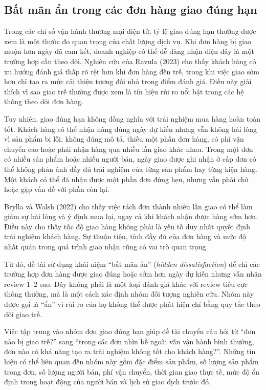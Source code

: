 \subsection{Bất mãn ẩn trong các đơn hàng giao đúng hạn}
\label{subsec:bat-man-an}

Trong các chỉ số vận hành thương mại điện tử, tỷ lệ giao đúng hạn thường được xem là một thước đo quan trọng của chất lượng dịch vụ. Khi đơn hàng bị giao muộn hơn ngày đã cam kết, doanh nghiệp có thể dễ dàng nhận diện đây là một trường hợp cần theo dõi. Nghiên cứu của Ravula (2023) cho thấy khách hàng có xu hướng đánh giá thấp rõ rệt hơn khi đơn hàng đến trễ, trong khi việc giao sớm hơn chỉ tạo ra mức cải thiện tương đối nhỏ trong điểm đánh giá. Điều này giải thích vì sao giao trễ thường được xem là tín hiệu rủi ro nổi bật trong các hệ thống theo dõi đơn hàng.

Tuy nhiên, giao đúng hạn không đồng nghĩa với trải nghiệm mua hàng hoàn toàn tốt. Khách hàng có thể nhận hàng đúng ngày dự kiến nhưng vẫn không hài lòng vì sản phẩm bị lỗi, không đúng mô tả, thiếu một phần đơn hàng, có phí vận chuyển cao hoặc phải nhận hàng qua nhiều lần giao khác nhau. Trong một đơn có nhiều sản phẩm hoặc nhiều người bán, ngày giao được ghi nhận ở cấp đơn có thể không phản ánh đầy đủ trải nghiệm của từng sản phẩm hay từng kiện hàng. Một khách có thể đã nhận được một phần đơn đúng hẹn, nhưng vẫn phải chờ hoặc gặp vấn đề với phần còn lại.

Brylla và Walsh (2022) cho thấy việc tách đơn thành nhiều lần giao có thể làm giảm sự hài lòng và ý định mua lại, ngay cả khi khách nhận được hàng sớm hơn. Điều này cho thấy tốc độ giao hàng không phải là yếu tố duy nhất quyết định trải nghiệm khách hàng. Sự thuận tiện, tính đầy đủ của đơn hàng và mức độ nhất quán trong quá trình giao nhận cũng có vai trò quan trọng.

Từ đó, đề tài sử dụng khái niệm ``bất mãn ẩn'' (\emph{hidden dissatisfaction}) để chỉ các trường hợp đơn hàng được giao đúng hoặc sớm hơn ngày dự kiến nhưng vẫn nhận review 1--2 sao. Đây không phải là một loại đánh giá khác với review tiêu cực thông thường, mà là một cách xác định nhóm đối tượng nghiên cứu. Nhóm này được gọi là ``ẩn'' vì rủi ro của họ không thể được phát hiện chỉ bằng quy tắc theo dõi giao trễ.

Việc tập trung vào nhóm đơn giao đúng hạn giúp đề tài chuyển câu hỏi từ ``đơn nào bị giao trễ?'' sang ``trong các đơn nhìn bề ngoài vẫn vận hành bình thường, đơn nào có khả năng tạo ra trải nghiệm không tốt cho khách hàng?''. Những tín hiệu có thể liên quan đến nhóm này gồm đặc điểm sản phẩm, số lượng sản phẩm trong đơn, số lượng người bán, phí vận chuyển, thời gian giao thực tế, mức độ ổn định trong hoạt động của người bán và lịch sử giao dịch trước đó.

